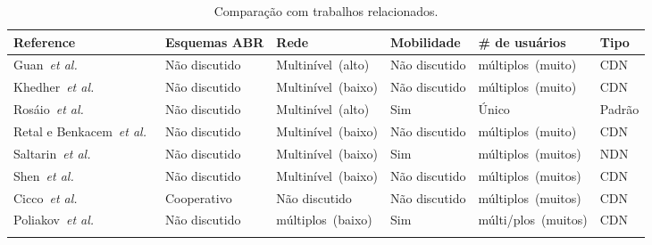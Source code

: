 \begin{table}[htb]
  \caption{Comparação com trabalhos relacionados.}
  \label{tab:comparison}
  \centering
  \scriptsize
  \begin{tabular}{p{2.8cm}p{2cm}p{2.3cm}p{2.2cm}p{2.3cm}p{2cm}}
    \toprule
    \textbf{Reference} &
    \textbf{Esquemas ABR} &
    \textbf{Rede} &
    \textbf{Mobilidade} &
    \textbf{\# de \newline usuários} &
    \textbf{Tipo} \\
    \midrule

    Guan~\textit{et al.}~\cite{guan:2019:CLC} &
    Não discutido & Multinível~(alto) & Não discutido & múltiplos~(muito) & CDN \\
    \addlinespace
	\addlinespace

    Khedher~\textit{et al.}~\cite{khedherComNet2017,khedherLCN2017} &
    Não discutido & Multinível~(baixo) & Não discutido & múltiplos~(muito) & CDN \\
    \addlinespace
    \addlinespace

    Rosáio~\textit{et al.}~\cite{rosarioSENSORS2018} &
    Não discutido & Multinível~(alto) & Sim & Único & Padrão \\
    \addlinespace
	\addlinespace
	
    Retal e Benkacem~\textit{et al.}~\cite{retalICC2017,talebComMag17} &
    Não discutido & Multinível~(baixo) & Não discutido & múltiplos~(muito) & CDN \\
    \addlinespace
	\addlinespace
	
    Saltarin~\textit{et al.}~\cite{saltarinTrans2017} &
    Não discutido & Multinível~(baixo) & Sim & múltiplos~(muitos) & NDN \\
    \addlinespace
	\addlinespace

    Shen~\textit{et al.}~\cite{shenIWQoS19} &
    Não discutido & Multinível~(baixo) & Não discutido & múltiplos~(muitos) & CDN \\
    \addlinespace
	\addlinespace
	
    Cicco~\textit{et al.}~\cite{cicco:2019:QRA} &
    Cooperativo & Não discutido & Não discutido & múltiplos~(muitos) & CDN \\
    \addlinespace
	\addlinespace
	
    Poliakov~\textit{et al.}~\cite{poliakovPHD2018} &
    Não discutido & múltiplos~(baixo) & Sim & múlti/plos~(muitos) & CDN \\
    \addlinespace
	\addlinespace



\end{tabular}
\end{table}
